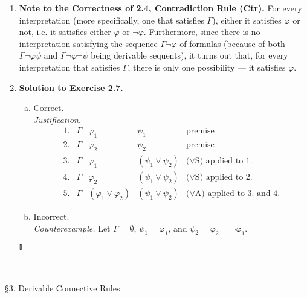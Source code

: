 \begin{enumerate}[1.]
\item \textbf{Note to the Correctness of 2.4, Contradiction Rule (Ctr).} For every interpretation (more specifically, one that satisfies $\Gamma$), either it satisfies $\varphi$ or not, i.e. it satisfies either $\varphi$ or $\neg \varphi$. Furthermore, since there is no interpretation satisfying the sequence $\Gamma \neg \varphi$ of formulas (because of both $\Gamma \neg \varphi \psi$ and $\Gamma \neg \varphi \neg \psi$ being derivable sequents), it turns out that, for every interpretation that satisfies $\Gamma$, there is only one possibility --- it satisfies $\varphi$.
%
\item \textbf{Solution to Exercise 2.7.}
\begin{enumerate}[(a)]
\item Correct. \\
\textit{Justification.}
\[
\begin{array}{lllll}
1. & \Gamma & \varphi_1 & \psi_1 & \mbox{premise} \\
2. & \Gamma & \varphi_2 & \psi_2 & \mbox{premise} \\
3. & \Gamma & \varphi_1 & (\psi_1 \lor \psi_2) & \mbox{($\lor$S) applied to 1.} \\
4. & \Gamma & \varphi_2 & (\psi_1 \lor \psi_2) & \mbox{($\lor$S) applied to 2.} \\
5. & \Gamma & (\varphi_1 \lor \varphi_2) & (\psi_1 \lor \psi_2) & \mbox{($\lor$A) applied to 3. and 4.} 
\end{array}
\]
\item Incorrect. \\
\textit{Counterexample.} Let $\Gamma = \emptyset$, $\psi_1 = \varphi_1$, and $\psi_2 = \varphi_2 = \neg \varphi_1$. 
\end{enumerate} \begin{flushright}$\talloblong$\end{flushright}
\end{enumerate}
\ 
\\
\\
{\large \S3. Derivable Connective Rules}
